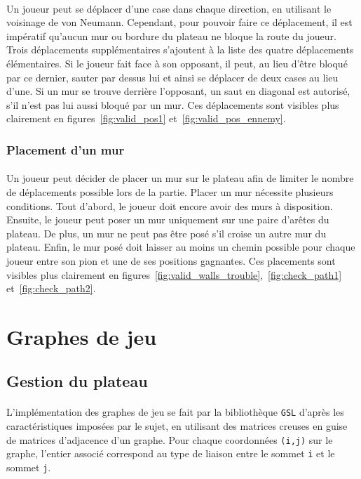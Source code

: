 \documentclass[a4paper]{article}
\begin{document}
\paragraph{}
Un joueur peut se déplacer d'une case dans chaque direction, en utilisant le voisinage de von Neumann\cite{voisinage}. Cependant, pour pouvoir faire ce déplacement, il est impératif qu'aucun mur ou bordure du plateau ne bloque la route du joueur. Trois déplacements supplémentaires s'ajoutent à la liste des quatre déplacements élémentaires. Si le joueur fait face à son opposant, il peut, au lieu d'être bloqué par ce dernier, sauter par dessus lui et ainsi se déplacer de deux cases au lieu d'une. Si un mur se trouve derrière l'opposant, un saut en diagonal est autorisé, s'il n'est pas lui aussi bloqué par un mur. Ces déplacements sont visibles plus clairement en figures~\ref{fig:valid_pos1} et~\ref{fig:valid_pos_ennemy}.

\subsubsection{Placement d'un mur}
\paragraph{}
Un joueur peut décider de placer un mur sur le plateau afin de limiter le nombre de déplacements possible lors de la partie. Placer un mur nécessite plusieurs conditions. Tout d'abord, le joueur doit encore avoir des murs à disposition. Ensuite, le joueur peut poser un mur uniquement sur une paire d'arêtes du plateau. De plus, un mur ne peut pas être posé s'il croise un autre mur du plateau. Enfin, le mur posé doit laisser au moins un chemin possible pour chaque joueur entre son pion et une de ses positions gagnantes. Ces placements sont visibles plus clairement en figures~\ref{fig:valid_walls_trouble},~\ref{fig:check_path1} et~\ref{fig:check_path2}.

\clearpage
\section{Graphes de jeu}

\subsection{Gestion du plateau}
\paragraph{}
L'implémentation des graphes de jeu se fait par la bibliothèque \texttt{GSL} d'après les caractéristiques imposées par le sujet, en utilisant des matrices creuses en guise de matrices d'adjacence d'un graphe. Pour chaque coordonnées \texttt{(i,j)} sur le graphe, l'entier associé correspond au type de liaison entre le sommet \texttt{i} et le sommet \texttt{j}.
\end{document}
